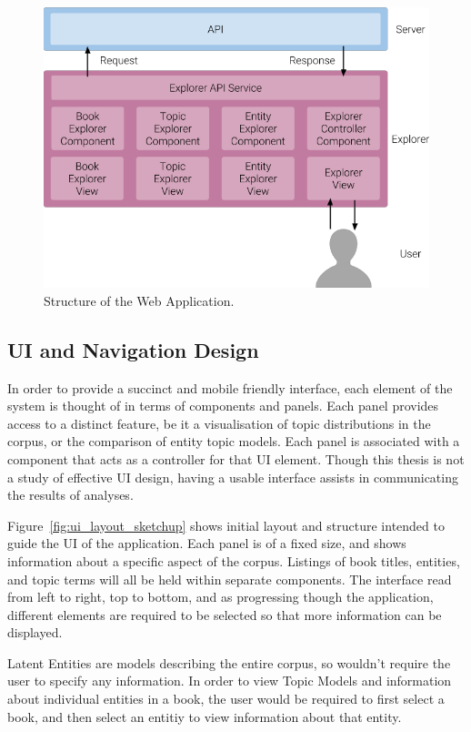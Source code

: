\documentclass[10pt]{report}
\begin{document}
\begin{figure}[h!]
  \centering
  \includegraphics[scale=0.5]{web_app_structure}

  \caption{Structure of the Web Application. \label{fig:web_app_structure}}
\end{figure}

\subsection{UI and Navigation Design }
In order to provide a succinct and mobile friendly interface, each element of the system is thought of in terms of components and panels. Each panel provides access to a distinct feature, be it a visualisation of topic distributions in the corpus, or the comparison of entity topic models. Each panel is associated with a component that acts as a controller for that UI element. Though this thesis is not a study of effective UI design, having a usable interface assists in communicating the results of analyses.

Figure~\ref{fig:ui_layout_sketchup} shows initial layout and structure intended to guide the UI of the application. Each panel is of a fixed size, and shows information about a specific aspect of the corpus. Listings of book titles, entities, and topic terms will all be held within separate components. The interface read from left to right, top to bottom, and as progressing though the application, different elements are required to be selected so that more information can be displayed.

Latent Entities are models describing the entire corpus, so wouldn't require the user to specify any information. In order to view Topic Models and information about individual entities in a book, the user would be required to first select a book, and then select an entitiy to view information about that entity.
\end{document}

